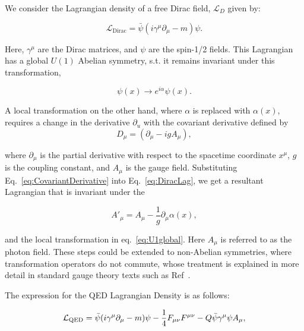 We consider the Lagrangian density of a free Dirac field, $\mathcal{L}_D$ given by:

\begin{equation}
\label{eq:DiracLag}
    \mathcal{L}_{\text{Dirac}} = \bar{\psi}(i\gamma^\mu\partial_\mu - m)\psi. 
\end{equation}

\filbreak
Here, $\gamma^\mu$ are the Dirac matrices, and $\psi$ are the spin-1/2 fields. This Lagrangian has a global $U(1)$ Abelian symmetry, s.t. it remains invariant under this transformation,

\begin{equation}
\label{eq:U1global}
    \psi(x) \rightarrow e^{i\alpha} \psi(x).
\end{equation}

A local transformation on the other hand, where $\alpha$ is replaced with $\alpha(x)$, requires a change in the derivative $\partial_u$ with the covariant derivative defined by
\begin{equation}
\label{eq:CovariantDerivative}
    D_{\mu}  = (\partial_{\mu} - ig A_{\mu}) , 
\end{equation}

where $\partial_{\mu}$ is the partial derivative with respect to the spacetime coordinate $x^{\mu}$, $g$ is the coupling constant, and $A_{\mu}$ is the gauge field. Substituting Eq.~\ref{eq:CovariantDerivative} into Eq.~\ref{eq:DiracLag}, we get a resultant Lagrangian that is invariant under the 

\begin{equation}
\label{eq:AuGaugeTransformation}
   A'_{\mu} = A_{\mu} - \frac{1}{g} \partial_{\mu} \alpha(x), 
\end{equation}

and the local transformation in eq.~\ref{eq:U1global}. Here $A_\mu$ is referred to as the photon field. These steps could be extended to non-Abelian symmetries, where transformation operators do not commute, whose treatment is explained in more detail in standard gauge theory texts such as Ref~\cite{Peskin:1995ev}.

The expression for the QED Lagrangian Density is as follows:

\begin{equation}
\label{eq:QEDLagrangian}
\mathcal{L}_{\textnormal{QED}} = \bar{\psi} (i \gamma^{\mu} \partial_{\mu} - m) \psi - \frac{1}{4} F_{\mu\nu} F^{\mu\nu} - Q \bar{\psi} \gamma^{\mu} \psi A_{\mu},
\end{equation}

